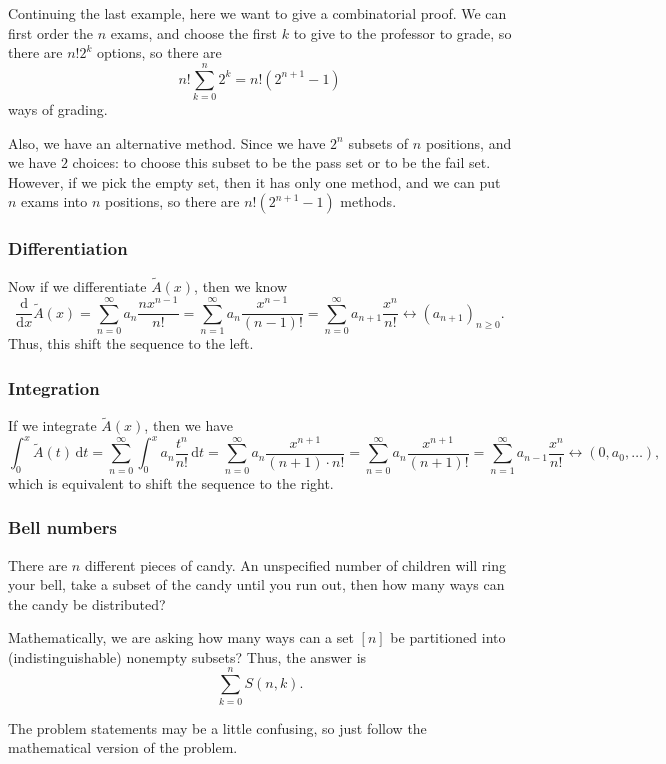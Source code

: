 Continuing the last example, here we want to give a combinatorial proof. 
We can first order the \(n\) exams, and choose the first \(k\) to give to the professor to grade, so there are \(n! 2^k\) options, so there are 
\[
    n! \sum_{k=0}^n 2^k = n!(2^{n+1} - 1) 
\] ways of grading.

Also, we have an alternative method. Since we have \(2^n\) subsets of \(n\) positions, and we have \(2\) choices: to choose this subset to be the pass set or to be the fail set. However, if we pick the empty set, then it has only one method, and we can put \(n\) exams into \(n\) positions, so there are \(n! \left( 2^{n+1} - 1 \right) \) methods. 

\subsubsection{Differentiation}
Now if we differentiate \(\widetilde{A} (x)\), then we know 
\[
    \frac{\mathrm{d}}{\mathrm{d}x} \widetilde{A} (x) = \sum_{n=0}^{\infty} a_n \frac{n x^{n-1}}{n!} = \sum_{n=1}^{\infty} a_n \frac{x^{n-1}}{(n-1)!} = \sum_{n=0}^{\infty} a_{n+1} \frac{x^n}{n!} \leftrightarrow (a_{n+1})_{n \ge 0}.   
\] Thus, this shift the sequence to the left.

\subsubsection{Integration}
If we integrate \(\widetilde{A} (x)\), then we have
\[
    \int _0^x \widetilde{A} (t) \, \mathrm{d} t = \sum_{n=0}^{\infty} \int _0^x a_n \frac{t^n}{n!} \, \mathrm{d} t = \sum_{n=0}^{\infty} a_n \frac{x^{n+1}}{(n+1) \cdot n!} = \sum_{n=0}^{\infty} a_n \frac{x^{n+1}}{(n+1)!} = \sum_{n=1}^{\infty} a_{n-1} \frac{x^n}{n!} \leftrightarrow (0, a_0, \dots ),     
\] which is equivalent to shift the sequence to the right. 
\subsubsection{Bell numbers}
\begin{eg}
    There are \(n\) different pieces of candy. An unspecified number of children will ring your bell, take a subset of the candy until you run out, then how many ways can the candy be distributed? 
\end{eg}
\begin{explanation}
    Mathematically, we are asking how many ways can a set \([n]\) be partitioned into (indistinguishable) nonempty subsets? Thus, the answer is \[\sum_{k=0}^n S(n, k). \]
    \begin{note}
        The problem statements may be a little confusing, so just follow the mathematical version of the problem.
    \end{note}
\end{explanation}


